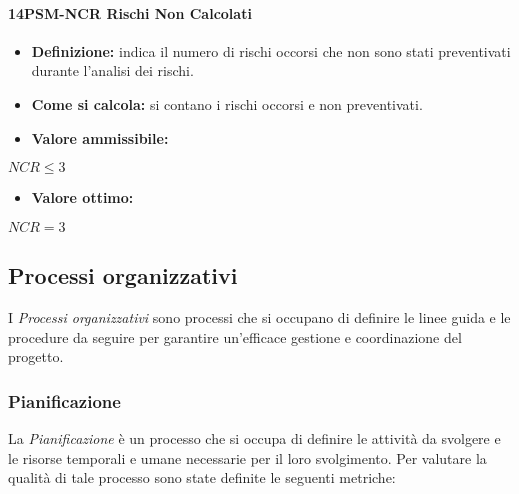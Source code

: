 \paragraph*{14PSM-NCR Rischi Non Calcolati}
\begin{itemize}
    \item \textbf{Definizione:} indica il numero di rischi occorsi che non sono stati preventivati durante l’analisi dei rischi.
    \item \textbf{Come si calcola:}  si contano i rischi occorsi e non preventivati.
\end{itemize}
\begin{itemize}
    \item \textbf{Valore ammissibile:}
\end{itemize}
\begin{center}
    $NCR \leq 3$
\end{center}
\begin{itemize}
    \item \textbf{Valore ottimo:}
\end{itemize}
\begin{center}
    $NCR = 3$
\end{center}

\subsection{Processi organizzativi}
I \emph{Processi organizzativi} sono processi che si occupano di definire le linee guida e le procedure da seguire per garantire un'efficace gestione e coordinazione del progetto.

\subsubsection{Pianificazione}
La \emph{Pianificazione} è un processo che si occupa di definire le attività da svolgere e le risorse temporali e umane necessarie per il loro svolgimento. Per valutare la qualità di tale processo sono state definite le seguenti metriche:

